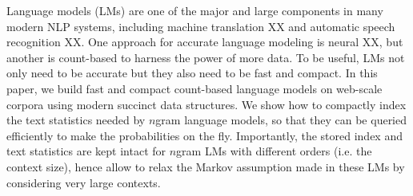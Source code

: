 Language models (LMs) are one of the major and large components in many modern NLP systems, including machine translation XX and automatic speech recognition XX.
%
One approach for accurate language modeling is neural XX, but another is  count-based to harness the power of more data.
%
To be useful, LMs not only need to be accurate but they also need to be fast and compact.
%
In this paper, we build  fast and compact count-based language models on web-scale corpora using modern succinct data structures.
%
We show how to compactly index the text statistics needed by $n$gram language models, so that they can be queried efficiently to make the probabilities on the fly.       
%
Importantly, the stored index and text statistics are kept intact for $n$gram LMs with different orders (i.e. the context size), hence allow to relax the
Markov assumption made in these LMs by considering very large contexts.


  
%
 






